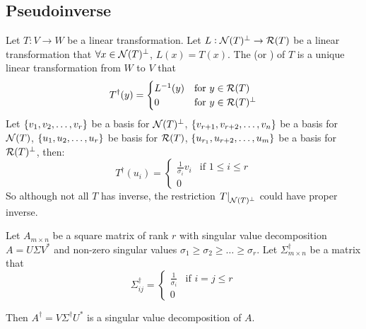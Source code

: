 \subsection{Pseudoinverse}

\begin{definition}
    Let $T: V \rightarrow W$ be a linear transformation. Let $L: \mathcal{N}(T)^\bot \rightarrow \mathcal{R}(T)$ be a linear transformation that $\forall x \in \mathcal{N}(T)^\bot$, $L(x) = T(x)$. The  (or ) of $T$ is a unique linear transformation from $W$ to $V$ that
    \begin{equation}
        T^\dag (y) = \begin{cases}
            L^{-1}(y) & \text{for } y \in \mathcal{R}(T) \\
            0 & \text{for } y \in \mathcal{R}(T)^\bot
        \end{cases}
    \end{equation}
    Let $\set{v_1, v_2,\dots, v_r}$ be a basis for $\mathcal{N}(T)^\bot$, $\set{v_{r+1}, v_{r+2}, \dots, v_{n}}$ be a basis for $\mathcal{N}(T)$, $\set{u_1, u_2, \dots, u_r}$ be basis for $\mathcal{R}(T)$, $\set{u_{r_1}, u_{r+2}, \dots, u_m}$ be a basis for $\mathcal{R}(T)^\bot$, then:
    \begin{equation*}
        T^\dag (u_i) = \begin{cases}
            \displaystyle \frac{1}{\sigma_i} v_i & \text{if } 1 \leq i \leq r \\
            0
        \end{cases}
    \end{equation*}
    So although not all $T$ has inverse, the restriction $\left. T \right|_{\mathcal{N}(T)^\bot}$ could have proper inverse.
\end{definition}

\begin{theorem}
    Let $A_{m \times n}$ be a square matrix of rank $r$ with singular value decomposition $A = U \Sigma V^*$ and non-zero singular values $\sigma_1 \geq \sigma_2 \geq \dots \geq \sigma_r$. Let $\Sigma^\dag_{m \times n}$  be a matrix that 
    \begin{equation}
        \Sigma^\dag_{ij} = \begin{cases}
            \displaystyle \frac{1}{\sigma_i} & \text{if } i = j \leq r \\
            0 
        \end{cases}
    \end{equation}
    
    Then $A^\dag = V \Sigma^\dag U^*$ is a singular value decomposition of $A$.
\end{theorem}


